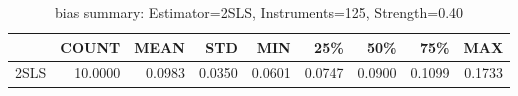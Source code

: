 \begin{table}[ht]
\centering
\caption{bias summary: Estimator=2SLS, Instruments=125, Strength=0.40}
\begin{tabular}{lrrrrrrrr}
\toprule
 & COUNT & MEAN & STD & MIN & 25\% & 50\% & 75\% & MAX \\
\midrule
2SLS & 10.0000 & 0.0983 & 0.0350 & 0.0601 & 0.0747 & 0.0900 & 0.1099 & 0.1733 \\
\bottomrule
\end{tabular}
\end{table}
